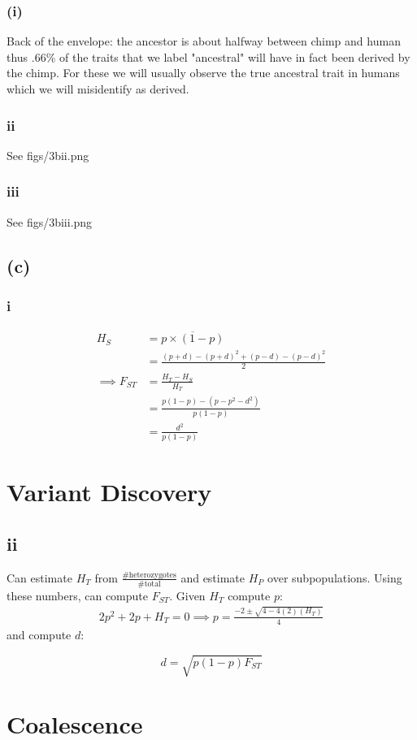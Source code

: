 \documentclass[12pt,draft,a4paper]{article}
\begin{document}
\subsubsection*{(i)}
Back of the envelope: the ancestor is about halfway between chimp and human thus $.66$\% of the traits that we label "ancestral" will have in fact been derived by the chimp. For these we will usually observe the true ancestral trait in humans which we will misidentify as derived. 

\subsubsection*{ii}

See figs/3bii.png

\subsubsection*{iii}

See figs/3biii.png

\subsection*{(c)}
\subsubsection*{i}
\begin{align*} H_S &= \overline{p\times(1 - p)}\\
&=\frac{\left(p+d\right) - \left(p+d\right)^2 + \left(p-d\right) - \left(p-d\right)^2}{2}\\
\implies F_{ST} &= \frac{H_T - H_S}{H_T}\\
&= \frac{ p(1-p) - (p-p^2-d^2)}{p(1-p)}\\
&=\frac{d^2}{p(1-p)}\end{align*}
\section{Variant Discovery}
\subsection*{ii}
Can estimate $H_T$ from $\frac{\text{\#heterozygotes}}{\text{\#total}}$ and estimate $H_P$ over subpopulations. Using these numbers, can compute $F_{ST}$. Given $H_{T}$ compute $p$:
\begin{align*}
2p^2 + 2p + H_T = 0 \implies p =\frac{ -2 \pm \sqrt{4 - 4(2)(H_T)}}{4}
\end{align*}
and compute $d$:

\begin{equation} d = \sqrt{p(1-p)F_{ST}} \end{equation}

\section{Coalescence}



\end{document}
